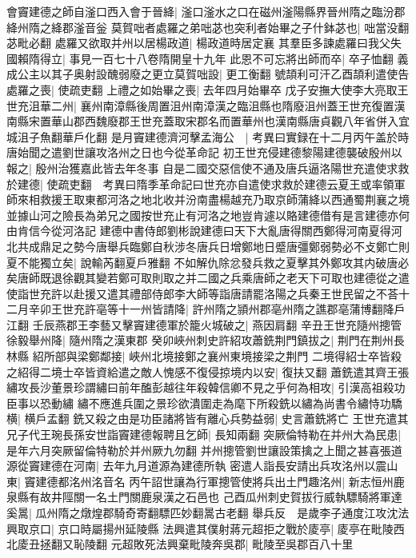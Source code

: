 會竇建德之師自滏口西入會于晉絳|{
	滏口滏水之口在磁州滏陽縣界晉州隋之臨汾郡絳州隋之絳郡滏音釡}
莫賀咄者處羅之弟咄苾也突利者始畢之子什鉢苾也|{
	咄當没翻苾毗必翻}
處羅又欲取并州以居楊政道|{
	楊政道時居定襄}
其羣臣多諫處羅曰我父失國賴隋得立|{
	事見一百七十八卷隋開皇十九年}
此恩不可忘將出師而卒|{
	卒子恤翻}
義成公主以其子奥射設醜弱廢之更立莫賀咄設|{
	更工衡翻}
號頡利可汗乙酉頡利遣使告處羅之喪|{
	使疏吏翻}
上禮之如始畢之喪|{
	去年四月始畢卒}
戊子安撫大使李大亮取王世充沮華二州|{
	襄州南漳縣後周置沮州南漳漢之臨沮縣也隋廢沮州蓋王世充復置漢南縣宋置華山郡西魏廢郡王世充蓋取宋郡名而置華州也漢南縣唐貞觀八年省併入宜城沮子魚翻華戶化翻}
是月竇建德濟河擊孟海公　|{
	考異曰實録在十二月丙午盖於時唐始聞之遣劉世讓攻洛州之日也今從革命記}
初王世充侵建德黎陽建德襲破殷州以報之|{
	殷州治獲嘉此皆去年冬事}
自是二國交惡信使不通及唐兵逼洛陽世充遣使求救於建德|{
	使疏吏翻　考異曰隋季革命記曰世充亦自遣使求救於建德云夏王或率領軍師來相救援王取東都河洛之地北收并汾南盡楊越充乃取京師蒲絳以西通蜀荆襄之境並據山河之險長為弟兄之國按世充止有河洛之地豈肯遽以賂建德借有是言建德亦何由肯信今從河洛記}
建德中書侍郎劉彬說建德曰天下大亂唐得關西鄭得河南夏得河北共成鼎足之勢今唐舉兵臨鄭自秋涉冬唐兵日增鄭地日蹙唐彊鄭弱勢必不攴鄭亡則夏不能獨立矣|{
	說輸芮翻夏戶雅翻}
不如解仇除忿發兵救之夏擊其外鄭攻其内破唐必矣唐師既退徐觀其變若鄭可取則取之并二國之兵乘唐師之老天下可取也建德從之遣使詣世充許以赴援又遣其禮部侍郎李大師等詣唐請罷洛陽之兵秦王世民留之不荅十二月辛卯王世充許亳等十一州皆請降|{
	許州隋之頴州郡亳州隋之譙郡亳蒲博翻降戶江翻}
壬辰燕郡王李藝又擊竇建德軍於籠火城破之|{
	燕因肩翻}
辛丑王世充隨州摠管徐毅舉州降|{
	隨州隋之漢東郡}
癸卯峽州刺史許紹攻蕭銑荆門鎮拔之|{
	荆門在荆州長林縣}
紹所部與梁鄭鄰接|{
	峽州北境接鄭之襄州東境接梁之荆門}
二境得紹士卒皆殺之紹得二境士卒皆資給遣之敵人愧感不復侵掠境内以安|{
	復扶又翻}
蕭銑遣其齊王張繡攻長沙董景珍謂繡曰前年醢彭越往年殺韓信卿不見之乎何為相攻|{
	引漢高祖殺功臣事以恐動繡}
繡不應進兵圍之景珍欲潰圍走為麾下所殺銑以繡為尚書令繡恃功驕横|{
	横戶孟翻}
銑又殺之由是功臣諸將皆有離心兵勢益弱|{
	史言蕭銑將亡}
王世充遣其兄子代王琬長孫安世詣竇建德報聘且乞師|{
	長知兩翻}
突厥倫特勒在并州大為民患|{
	是年六月突厥留倫特勒於并州厥九勿翻}
并州摠管劉世讓設策擒之上聞之甚喜張道源從竇建德在河南|{
	去年九月道源為建德所執}
密遣人詣長安請出兵攻洺州以震山東|{
	竇建德都洺州洺音名}
丙午詔世讓為行軍摠管使將兵出土門趣洺州|{
	新志恒州鹿泉縣有故井陘關一名土門關鹿泉漢之石邑也}
己酉瓜州刺史賀拔行威執驃騎將軍達奚暠|{
	瓜州隋之燉煌郡騎奇寄翻驃匹妙翻暠古老翻}
舉兵反　是歲李子通度江攻沈法興取京口|{
	京口時屬揚州延陵縣}
法興遣其僕射蔣元超拒之戰於庱亭|{
	庱亭在毗陵西北庱丑拯翻又恥陵翻}
元超敗死法興棄毗陵奔吳郡|{
	毗陵至吳郡百八十里}
